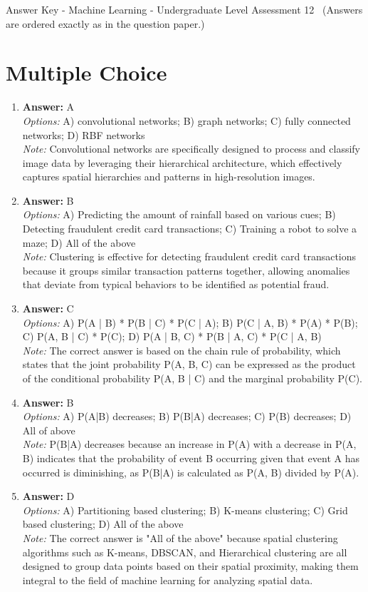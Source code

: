 \documentclass[12pt]{article}
\begin{document}
\begin{center}
Answer Key - Machine Learning - Undergraduate Level Assessment 12 \
\small (Answers are ordered exactly as in the question paper.)
\end{center}

\section*{Multiple Choice}
\begin{enumerate}[label=\arabic*.]
\item \textbf{Answer:} A
\\ \textit{Options:} A) convolutional networks; B) graph networks; C) fully connected networks; D) RBF networks
\\ \textit{Note:} Convolutional networks are specifically designed to process and classify image data by leveraging their hierarchical architecture, which effectively captures spatial hierarchies and patterns in high-resolution images.
\item \textbf{Answer:} B
\\ \textit{Options:} A) Predicting the amount of rainfall based on various cues; B) Detecting fraudulent credit card transactions; C) Training a robot to solve a maze; D) All of the above
\\ \textit{Note:} Clustering is effective for detecting fraudulent credit card transactions because it groups similar transaction patterns together, allowing anomalies that deviate from typical behaviors to be identified as potential fraud.
\item \textbf{Answer:} C
\\ \textit{Options:} A) P(A | B) * P(B | C) * P(C | A); B) P(C | A, B) * P(A) * P(B); C) P(A, B | C) * P(C); D) P(A | B, C) * P(B | A, C) * P(C | A, B)
\\ \textit{Note:} The correct answer is based on the chain rule of probability, which states that the joint probability P(A, B, C) can be expressed as the product of the conditional probability P(A, B | C) and the marginal probability P(C).
\item \textbf{Answer:} B
\\ \textit{Options:} A) P(A|B) decreases; B) P(B|A) decreases; C) P(B) decreases; D) All of above
\\ \textit{Note:} P(B|A) decreases because an increase in P(A) with a decrease in P(A, B) indicates that the probability of event B occurring given that event A has occurred is diminishing, as P(B|A) is calculated as P(A, B) divided by P(A).
\item \textbf{Answer:} D
\\ \textit{Options:} A) Partitioning based clustering; B) K-means clustering; C) Grid based clustering; D) All of the above
\\ \textit{Note:} The correct answer is "All of the above" because spatial clustering algorithms such as K-means, DBSCAN, and Hierarchical clustering are all designed to group data points based on their spatial proximity, making them integral to the field of machine learning for analyzing spatial data.
\end{enumerate}
\end{document}
